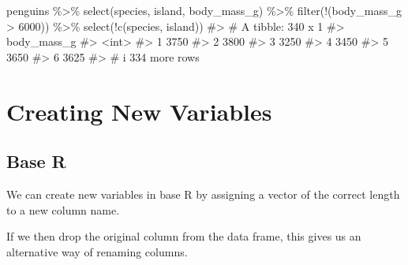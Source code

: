 \documentclass[
  letterpaper,
  DIV=11,
  numbers=noendperiod]{scrreprt}
\newenvironment{Shaded}{\begin{snugshade}}{\end{snugshade}}
\newcommand{\CommentTok}[1]{\textcolor[rgb]{0.37,0.37,0.37}{#1}}
\newcommand{\DecValTok}[1]{\textcolor[rgb]{0.68,0.00,0.00}{#1}}
\newcommand{\FunctionTok}[1]{\textcolor[rgb]{0.28,0.35,0.67}{#1}}
\newcommand{\NormalTok}[1]{\textcolor[rgb]{0.00,0.23,0.31}{#1}}
\newcommand{\OtherTok}[1]{\textcolor[rgb]{0.00,0.23,0.31}{#1}}
\newcommand{\SpecialCharTok}[1]{\textcolor[rgb]{0.37,0.37,0.37}{#1}}
\begin{document}
\begin{Shaded}
\begin{Highlighting}[]
\NormalTok{penguins }\SpecialCharTok{\%\textgreater{}\%} 
  \FunctionTok{select}\NormalTok{(species, island, body\_mass\_g) }\SpecialCharTok{\%\textgreater{}\%} 
  \FunctionTok{filter}\NormalTok{(}\SpecialCharTok{!}\NormalTok{(body\_mass\_g }\SpecialCharTok{\textgreater{}} \DecValTok{6000}\NormalTok{)) }\SpecialCharTok{\%\textgreater{}\%} 
  \FunctionTok{select}\NormalTok{(}\SpecialCharTok{!}\FunctionTok{c}\NormalTok{(species, island))}
\CommentTok{\#\textgreater{} \# A tibble: 340 x 1}
\CommentTok{\#\textgreater{}   body\_mass\_g}
\CommentTok{\#\textgreater{}         \textless{}int\textgreater{}}
\CommentTok{\#\textgreater{} 1        3750}
\CommentTok{\#\textgreater{} 2        3800}
\CommentTok{\#\textgreater{} 3        3250}
\CommentTok{\#\textgreater{} 4        3450}
\CommentTok{\#\textgreater{} 5        3650}
\CommentTok{\#\textgreater{} 6        3625}
\CommentTok{\#\textgreater{} \# i 334 more rows}
\end{Highlighting}
\end{Shaded}

\section{Creating New Variables}\label{creating-new-variables}

\subsection{Base R}\label{base-r-2}

We can create new variables in base R by assigning a vector of the
correct length to a new column name.

\begin{Shaded}
\end{Shaded}

If we then drop the original column from the data frame, this gives us
an alternative way of renaming columns.
\end{document}
